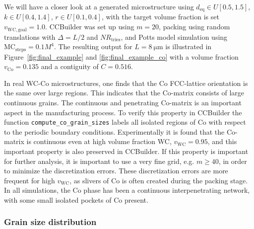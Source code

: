 \documentclass[3p,12pt]{elsarticle}
\newcommand{\Co}{\mathrm{Co}}
\newcommand{\WC}{\mathrm{WC}}
\begin{document}
We will have a closer look at a generated microstructure using $d_\text{eq} \in U[0.5, 1.5]$, $k \in U[0.4, 1.4]$, $r \in U[0.1, 0.4]$, with the target volume fraction is set $v_{\WC,\text{goal}} = 1.0$. CCBuilder was set up using $m = 20$, packing using random translations with $\Delta = L/2$ and $NR_\text{tries}$, and Potts model simulation using $\text{MC}_\text{steps} = 0.1 M^4$.
The resulting output for $L = \SI{8}{\micro\meter}$ is illustrated in Figure~\ref{fig:final_example} and \ref{fig:final_example_co} with a volume fraction $v_\Co = 0.135$ and a contiguity of $C = 0.516$.

In real WC-Co microstructures, one finds that the Co FCC-lattice orientation is the same over large regions.
This indicates that the Co-matrix consists of large continuous grains.
The continuous and penetrating Co-matrix is an important aspect in the manufacturing process.
To verify this property in CCBuilder the function \verb+compute_co_grain_sizes+ labels all isolated regions of Co with respect to the periodic boundary conditions.
Experimentally it is found that the Co-matrix is continuous even at high volume fraction WC, $v_\WC = 0.95$, and this important property is also preserved in CCBuilder.
If this property is important for further analysis, it is important to use a very fine grid, e.g. $m \geq 40$, in order to minimize the discretization errors.
These discretization errors are more frequent for high $v_\WC$, as slivers of Co is often created during the packing stage.
In all simulations, the Co phase has been a continuous interpenetrating network, with some small isolated pockets of Co present.


\subsubsection{Grain size distribution}
\label{sec:grain_size_dist}
\end{document}
